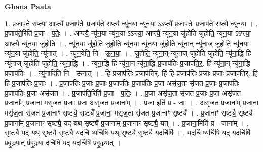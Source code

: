 \documentclass[17pt]{extarticle}
\begin{document}
\textbf{Ghana Paata } \newline

1. प्र॒जाप॑ते॒ राप्त्या॒ आप्त्यै᳚ प्र॒जाप॑तेः प्र॒जाप॑ते॒ राप्त्यै॒ न्यू॑न॒या न्यू॑न॒या ऽऽप्त्यै᳚ प्र॒जाप॑तेः प्र॒जाप॑ते॒ राप्त्यै॒ न्यू॑न॒या । . प्र॒जाप॑ते॒रिति॑ प्र॒जा - प॒तेः॒ । . आप्त्यै॒ न्यू॑न॒या न्यू॑न॒या ऽऽप्त्या॒ आप्त्यै॒ न्यू॑न॒या जु॑होति जुहोति॒ न्यू॑न॒या ऽऽप्त्या॒ आप्त्यै॒ न्यू॑न॒या जु॑होति । . न्यू॑न॒या जु॑होति जुहोति॒ न्यू॑न॒या न्यू॑न॒या जु॑होति॒ न्यू॑ना॒न् न्यू॑नाज् जुहोति॒ न्यू॑न॒या न्यू॑न॒या जु॑होति॒ न्यू॑नात् । . न्यू॑न॒येति॒ नि - ऊ॒न॒या॒ । . जु॒हो॒ति॒ न्यू॑ना॒न् न्यू॑नाज् जुहोति जुहोति॒ न्यू॑ना॒द्धि हि न्यू॑नाज् जुहोति जुहोति॒ न्यू॑ना॒द्धि । . न्यू॑ना॒द्धि हि न्यू॑ना॒न् न्यू॑ना॒द्धि प्र॒जाप॑तिः प्र॒जाप॑ति॒र्॒. हि न्यू॑ना॒न् न्यू॑ना॒द्धि प्र॒जाप॑तिः । . न्यू॑ना॒दिति॒ नि - ऊ॒ना॒त् । . हि प्र॒जाप॑तिः प्र॒जाप॑ति॒र्॒. हि हि प्र॒जाप॑तिः प्र॒जाः प्र॒जाः प्र॒जाप॑ति॒र्॒. हि हि प्र॒जाप॑तिः प्र॒जाः । . प्र॒जाप॑तिः प्र॒जाः प्र॒जाः प्र॒जाप॑तिः प्र॒जाप॑तिः प्र॒जा असृ॑ज॒ता सृ॑जत प्र॒जाः प्र॒जाप॑तिः प्र॒जाप॑तिः प्र॒जा असृ॑जत । . प्र॒जाप॑ति॒रिति॑ प्र॒जा - प॒तिः॒ । . प्र॒जा असृ॑ज॒ता सृ॑जत प्र॒जाः प्र॒जा असृ॑जत प्र॒जाना᳚म् प्र॒जाना॒ मसृ॑जत प्र॒जाः प्र॒जा असृ॑जत प्र॒जाना᳚म् । . प्र॒जा इति॑ प्र - जाः । . असृ॑जत प्र॒जाना᳚म् प्र॒जाना॒ मसृ॑ज॒ता सृ॑जत प्र॒जानाꣳ॒॒ सृष्ट्यै॒ सृष्ट्यै᳚ प्र॒जाना॒ मसृ॑ज॒ता सृ॑जत प्र॒जानाꣳ॒॒ सृष्ट्यै᳚ । . प्र॒जानाꣳ॒॒ सृष्ट्यै॒ सृष्ट्यै᳚ प्र॒जाना᳚म् प्र॒जानाꣳ॒॒ सृष्ट्यै॒ यद् यथ् सृष्ट्यै᳚ प्र॒जाना᳚म् प्र॒जानाꣳ॒॒ सृष्ट्यै॒ यत् । . प्र॒जाना॒मिति॑ प्र - जाना᳚म् । . सृष्ट्यै॒ यद् यथ् सृष्ट्यै॒ सृष्ट्यै॒ यद॒र्चि ष्य॒र्चिषि॒ यथ् सृष्ट्यै॒ सृष्ट्यै॒ यद॒र्चिषि॑ । . यद॒र्चि ष्य॒र्चिषि॒ यद् यद॒र्चिषि॑ प्रवृ॒ञ्ज्यात् प्र॑वृ॒ञ्ज्या द॒र्चिषि॒ यद् यद॒र्चिषि॑ प्रवृ॒ञ्ज्यात् । \newline
\end{document}
